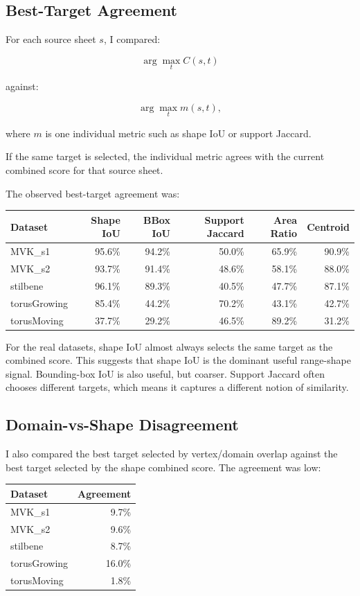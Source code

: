 \documentclass[11pt]{article}
\begin{document}
\subsection{Best-Target Agreement}

For each source sheet \(s\), I compared:

\[
\arg\max_t C(s,t)
\]

against:

\[
\arg\max_t m(s,t),
\]

where \(m\) is one individual metric such as shape IoU or support Jaccard.

If the same target is selected, the individual metric agrees with the current
combined score for that source sheet.

The observed best-target agreement was:

\begin{center}
\begin{tabular}{lrrrrr}
\toprule
Dataset & Shape IoU & BBox IoU & Support Jaccard & Area Ratio & Centroid \\
\midrule
MVK\_s1 & 95.6\% & 94.2\% & 50.0\% & 65.9\% & 90.9\% \\
MVK\_s2 & 93.7\% & 91.4\% & 48.6\% & 58.1\% & 88.0\% \\
stilbene & 96.1\% & 89.3\% & 40.5\% & 47.7\% & 87.1\% \\
torusGrowing & 85.4\% & 44.2\% & 70.2\% & 43.1\% & 42.7\% \\
torusMoving & 37.7\% & 29.2\% & 46.5\% & 89.2\% & 31.2\% \\
\bottomrule
\end{tabular}
\end{center}

For the real datasets, shape IoU almost always selects the same target as the
combined score. This suggests that shape IoU is the dominant useful range-shape
signal. Bounding-box IoU is also useful, but coarser. Support Jaccard often
chooses different targets, which means it captures a different notion of
similarity.

\subsection{Domain-vs-Shape Disagreement}

I also compared the best target selected by vertex/domain overlap against the
best target selected by the shape combined score. The agreement was low:

\begin{center}
\begin{tabular}{lr}
\toprule
Dataset & Agreement \\
\midrule
MVK\_s1 & 9.7\% \\
MVK\_s2 & 9.6\% \\
stilbene & 8.7\% \\
torusGrowing & 16.0\% \\
torusMoving & 1.8\% \\
\bottomrule
\end{tabular}
\end{center}
\end{document}
